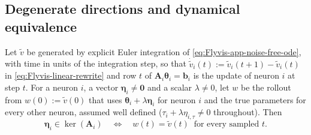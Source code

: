 \documentclass{article}
\begin{document}
\subsection{{\color{revised}Degenerate directions and dynamical equivalence}}
\label{app:dyneq}
{\color{revised}
\begin{theorem}
\label{thm:equiv}
Let $\tilde{v}$ be generated by explicit Euler integration of \cref{eq:Flyvis-app-noise-free-ode}, with time in units of the
integration step, so that $\dot{\tilde{v}}_i(t) := \tilde{v}_i(t+1)-\tilde{v}_i(t)$ in \cref{eq:Flyvis-linear-rewrite} and
row $t$ of $\mathbf{A}_i\boldsymbol{\theta}_i=\mathbf{b}_i$ is the update of neuron $i$ at step $t$. For a neuron $i$, a vector
$\boldsymbol{\eta}_i\neq\mathbf{0}$ and a scalar $\lambda\neq0$, let $w$ be the rollout from $w(0):=\tilde{v}(0)$ that uses
$\boldsymbol{\theta}_i+\lambda\boldsymbol{\eta}_i$ for neuron $i$ and the true parameters for every other neuron, assumed well
defined ($\tau_i+\lambda\eta_{i,\tau}\neq0$ throughout). Then
\begin{equation}
\boldsymbol{\eta}_i\in\ker(\mathbf{A}_i)\quad\Longleftrightarrow\quad w(t)=\tilde{v}(t)\ \text{ for every sampled } t .
\end{equation}
\end{theorem}
}




\end{document}
